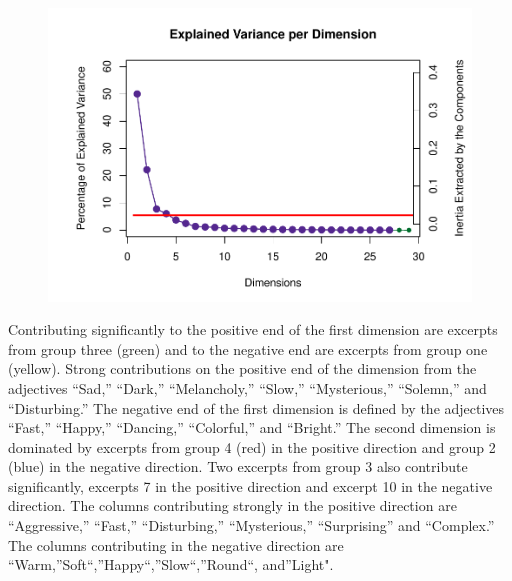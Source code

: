 \documentclass[
  english,
  man,floatsintext]{apa6}
\begin{document}
\begin{figure}

{\centering \includegraphics{Music-Descriptor-Space_files/figure-latex/scree4descriptors-1} 

}

\caption{ }\label{fig:scree4descriptors}
\end{figure}

Contributing significantly to the positive end of the first dimension are excerpts from group three (green) and to the negative end are excerpts from group one (yellow). Strong contributions on the positive end of the dimension from the adjectives ``Sad,'' ``Dark,'' ``Melancholy,'' ``Slow,'' ``Mysterious,'' ``Solemn,'' and ``Disturbing.'' The negative end of the first dimension is defined by the adjectives ``Fast,'' ``Happy,'' ``Dancing,'' ``Colorful,'' and ``Bright.''
The second dimension is dominated by excerpts from group 4 (red) in the positive direction and group 2 (blue) in the negative direction. Two excerpts from group 3 also contribute significantly, excerpts 7 in the positive direction and excerpt 10 in the negative direction. The columns contributing strongly in the positive direction are ``Aggressive,'' ``Fast,'' ``Disturbing,'' ``Mysterious,'' ``Surprising'' and ``Complex.'' The columns contributing in the negative direction are ``Warm,''Soft``,''Happy``,''Slow``,''Round``, and''Light".
\end{document}
